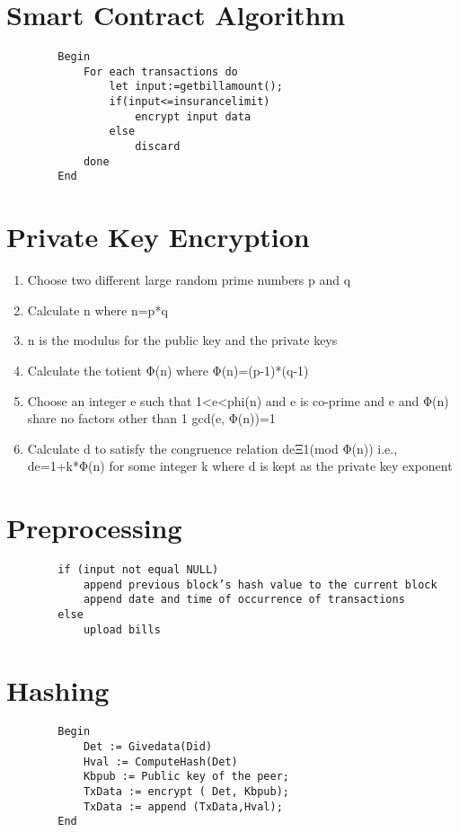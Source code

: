\section{Smart Contract Algorithm}


\begin{verbatim}
        Begin
            For each transactions do
                let input:=getbillamount();
                if(input<=insurancelimit)
                    encrypt input data
                else
                    discard
            done
        End
\end{verbatim}


\section{Private Key Encryption}
\begin{enumerate}
    \item Choose two different large random prime numbers p and q
    \item Calculate n where n=p*q
    \item n is the modulus for the public key and the private keys
    \item Calculate the totient Φ(n) where Φ(n)=(p-1)*(q-1)
    \item Choose an integer e such that 1<e<phi(n) and e is co-prime and e and Φ(n) share no factors other than 1
gcd(e, Φ(n))=1
    \item Calculate d to satisfy the congruence relation deΞ1(mod Φ(n)) i.e., de=1+k*Φ(n) for some integer k where d is kept as the private key exponent
\end{enumerate}
\section{Preprocessing}

\begin{verbatim}
        if (input not equal NULL)
            append previous block’s hash value to the current block
            append date and time of occurrence of transactions
        else
            upload bills
\end{verbatim}
\section{Hashing}
\begin{verbatim}
        Begin
            Det := Givedata(Did)
            Hval := ComputeHash(Det)
            Kbpub := Public key of the peer;
            TxData := encrypt ( Det, Kbpub);
            TxData := append (TxData,Hval);
        End
        
        
        
\end{verbatim}
